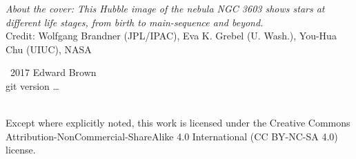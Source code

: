 
\maketitle
\newpage
\begin{fullwidth}
\thispagestyle{empty}

\vspace{3\baselineskip}
\noindent \textit{About the cover: This Hubble image of the nebula NGC 3603 shows stars at different life stages, from birth to main-sequence and beyond.} \\
\noindent Credit: Wolfgang Brandner (JPL/IPAC), Eva K. Grebel (U. Wash.), You-Hua Chu (UIUC), NASA

\vfill
\noindent \ccCopy\ 2017 Edward Brown\\
\noindent git version \ldots

\vspace{3\baselineskip}
\noindent \ccbyncsa \\
\noindent Except where explicitly noted, this work is licensed under the Creative Commons
Attribution-NonCommercial-ShareAlike 4.0 International (CC BY-NC-SA
4.0) license.

\end{fullwidth}

\newpage


\tableofcontents
\listoffigures
\listoftables
\listofsidebars
\listofexercises
